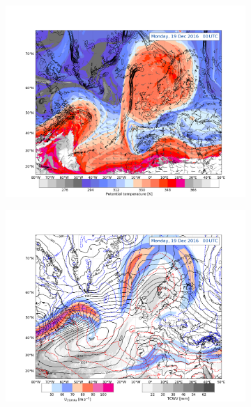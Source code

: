 \begin{figure}[ht!]
	\centering
	\begin{subfigure}[b]{0.49\textwidth}
		\includegraphics[trim={4.2cm 0cm 4.3cm 5.1cm},clip,
		width=\textwidth]{./fig_DynTropo/20161219_00}
		\caption{} \label{fig:DT19_00}
	\end{subfigure}
	\begin{subfigure}[b]{0.49\textwidth}
		\includegraphics[trim={4.2cm 0cm 4.3cm 5.1cm},clip,
		width=\textwidth]{./fig_Geopot_Jet/20161219_00}
		\caption{} \label{fig:GP19_00}
	\end{subfigure}

\end{figure}
